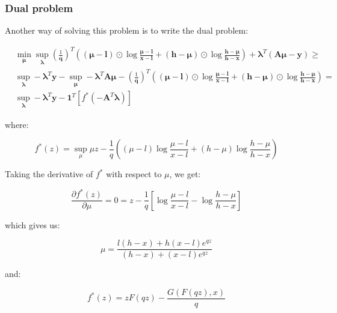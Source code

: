 \documentclass{tex/note}
\begin{document}
\subsubsection{Dual problem}

Another way of solving this problem is to write the dual problem:

\begin{align*}
& \min_{\bm{\mu}} \sup_{\bm{\lambda}} \left( \frac{1}{\bm{q}} \right)^T \left( \left( \bm{\mu} - \bm{l}  \right) \odot \log \frac{\bm{\mu} - \bm{l}}{\bm{x} - \bm{l}} + \left( \bm{h} - \bm{\mu} \right) \odot \log \frac{\bm{h} - \bm{\mu}}{\bm{h} - \bm{x}} \right) + \bm{\lambda}^T \left( \bm{A} \bm{\mu} - \bm{y} \right) \geq \\
& \sup_{\bm{\lambda}} - \bm{\lambda}^T \bm{y} - \sup_{\bm{\mu}} - \bm{\lambda}^T \bm{A} \bm{\mu} - \left( \frac{1}{\bm{q}} \right)^T \left( \left( \bm{\mu} - \bm{l}  \right) \odot \log \frac{\bm{\mu} - \bm{l}}{\bm{x} - \bm{l}} + \left( \bm{h} - \bm{\mu} \right) \odot \log \frac{\bm{h} - \bm{\mu}}{\bm{h} - \bm{x}} \right) = \\
& \sup_{\bm{\lambda}} - \bm{\lambda}^T \bm{y} -  \bm{1}^T \left[ f^* \left( - \bm{A}^T \bm{\lambda} \right) \right]
\end{align*}

where:

\begin{equation*}
f^* \left( z \right) = \sup_{\mu} \mu z - \frac{1}{q} \left( \left( \mu - l  \right) \log \frac{\mu - l}{x - l} + \left( h - \mu \right) \log \frac{h - \mu}{h - x} \right)
\end{equation*}

Taking the derivative of $f^*$ with respect to $\mu$, we get:

\begin{equation*}
\frac{\partial f^* \left( z \right)}{\partial \mu} = 0 = z - \frac{1}{q} \left[ \log \frac{\mu - l}{x - l} - \log \frac{h - \mu}{h - x} \right]
\end{equation*}

which gives us:

\begin{equation*}
\mu = \frac{l \left( h - x \right) + h \left( x - l \right) e^{q z}}{\left( h - x \right) + \left( x - l \right) e^{q z}}
\end{equation*}

and:

\begin{equation*}
f^* \left( z \right) = z F \left( q z \right) - \frac{G \left( F \left( q z \right) , x \right)}{q}
\end{equation*}
\end{document}
